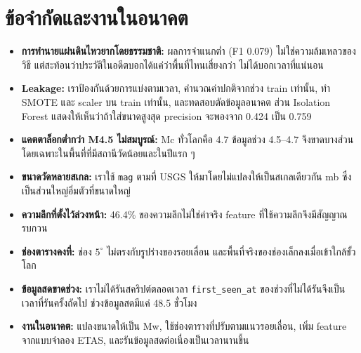 \documentclass[11pt,a4paper]{article}
\newcommand{\code}[1]{\texttt{#1}}
\begin{document}
\section{ข้อจำกัดและงานในอนาคต}

\begin{itemize}
  \item \textbf{การทำนายแผ่นดินไหวยากโดยธรรมชาติ:} ผลการจำแนกต่ำ (F1 0.079) ไม่ใช่ความล้มเหลวของวิธี แต่สะท้อนว่าประวัติในอดีตบอกได้แค่ว่าพื้นที่ไหนเสี่ยงกว่า ไม่ได้บอกเวลาที่แน่นอน
  \item \textbf{Leakage:} เราป้องกันด้วยการแบ่งตามเวลา, คำนวณค่าปกติจากช่วง train เท่านั้น, ทำ SMOTE และ scaler บน train เท่านั้น, และทดสอบตัดข้อมูลอนาคต ส่วน Isolation Forest แสดงให้เห็นว่าถ้าใส่ขนาดสูงสุด precision จะพองจาก 0.424 เป็น 0.759
  \item \textbf{แคตตาล็อกต่ำกว่า M4.5 ไม่สมบูรณ์:} Mc ทั่วโลกคือ 4.7 ข้อมูลช่วง 4.5--4.7 จึงขาดบางส่วน โดยเฉพาะในพื้นที่ที่มีสถานีวัดน้อยและในปีแรก ๆ
  \item \textbf{ขนาดวัดหลายสเกล:} เราใช้ \code{mag} ตามที่ USGS ให้มาโดยไม่แปลงให้เป็นสเกลเดียวกัน mb ซึ่งเป็นส่วนใหญ่อิ่มตัวที่ขนาดใหญ่
  \item \textbf{ความลึกที่ตั้งไว้ล่วงหน้า:} 46.4\% ของความลึกไม่ใช่ค่าจริง feature ที่ใช้ความลึกจึงมีสัญญาณรบกวน
  \item \textbf{ช่องตารางคงที่:} ช่อง $5^\circ$ ไม่ตรงกับรูปร่างของรอยเลื่อน และพื้นที่จริงของช่องเล็กลงเมื่อเข้าใกล้ขั้วโลก
  \item \textbf{ข้อมูลสดขาดช่วง:} เราไม่ได้รันสคริปต์ตลอดเวลา \code{first\_seen\_at} ของช่วงที่ไม่ได้รันจึงเป็นเวลาที่รันครั้งถัดไป ช่วงข้อมูลสดมีแค่ 48.5 ชั่วโมง
  \item \textbf{งานในอนาคต:} แปลงขนาดให้เป็น Mw, ใช้ช่องตารางที่ปรับตามแนวรอยเลื่อน, เพิ่ม feature จากแบบจำลอง ETAS, และรันข้อมูลสดต่อเนื่องเป็นเวลานานขึ้น
\end{itemize}
\end{document}
